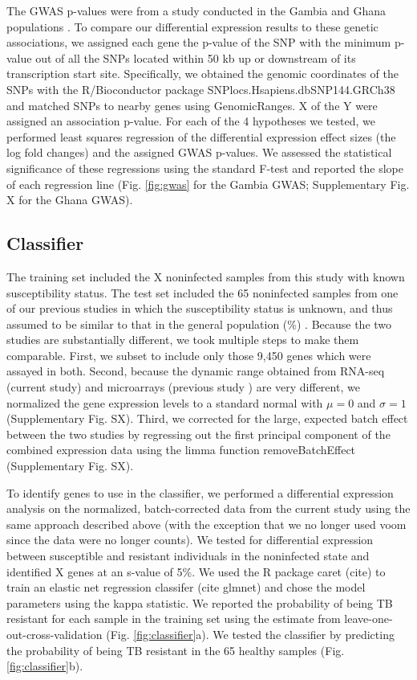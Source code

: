 \documentclass[fleqn,10pt]{wlscirep}
\begin{document}
The GWAS p-values were from a study conducted in the Gambia and Ghana populations \cite{Thye2010}. To compare our differential expression results to these genetic associations, we assigned each gene the p-value of the SNP with the minimum p-value out of all the SNPs located within 50 kb up or downstream of its transcription start site. Specifically, we obtained the genomic coordinates of the SNPs with the R/Bioconductor package SNPlocs.Hsapiens.dbSNP144.GRCh38 and matched SNPs to nearby genes using GenomicRanges. X of the Y were assigned an association p-value. For each of the 4 hypotheses we tested, we performed least squares regression of the differential expression effect sizes (the log fold changes) and the assigned GWAS p-values. We assessed the statistical significance of these regressions using the standard F-test and reported the slope of each regression line (Fig. \ref{fig:gwas} for the Gambia GWAS; Supplementary Fig. X for the Ghana GWAS).
\subsection*{Classifier}

The training set included the X noninfected samples from this study with known susceptibility status. The test set included the 65 noninfected samples from one of our previous studies in which the susceptibility status is unknown, and thus assumed to be similar to that in the general population (\%) \cite{Barreiro2012}. Because the two studies are substantially different, we took multiple steps to make them comparable. First, we subset to include only those 9,450 genes which were assayed in both. Second, because the dynamic range obtained from RNA-seq (current study) and microarrays (previous study \cite{Barreiro2012}) are very different, we normalized the gene expression levels to a standard normal with $\mu = 0$ and $\sigma = 1$ (Supplementary Fig. SX). Third, we corrected for the large, expected batch effect between the two studies by regressing out the first principal component of the combined expression data using the limma function removeBatchEffect \cite{Ritchie2015} (Supplementary Fig. SX).

To identify genes to use in the classifier, we performed a differential expression analysis on the normalized, batch-corrected data from the current study using the same approach described above (with the exception that we no longer used voom since the data were no longer counts). We tested for differential expression between susceptible and resistant individuals in the noninfected state and identified X genes at an s-value of 5\%. We used the R package caret (cite) to train an elastic net regression classifer (cite glmnet) and chose the model parameters using the kappa statistic. We reported the probability of being TB resistant for each sample in the training set using the estimate from leave-one-out-cross-validation (Fig. \ref{fig:classifier}a). We tested the classifier by predicting the probability of being TB resistant in the 65 healthy samples (Fig. \ref{fig:classifier}b).
\end{document}
